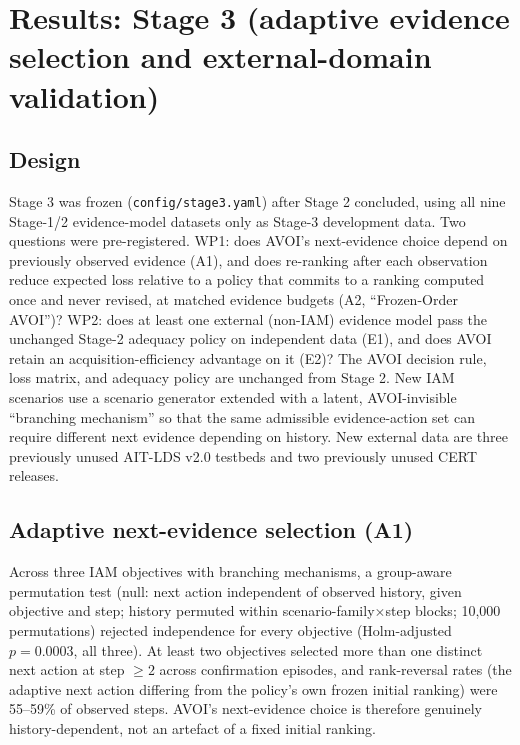 \section{Results: Stage 3 (adaptive evidence selection and external-domain validation)}

\subsection{Design}
Stage 3 was frozen (\texttt{config/stage3.yaml}) after Stage 2 concluded, using all nine Stage-1/2 evidence-model
datasets only as Stage-3 development data. Two questions were pre-registered. WP1: does AVOI's next-evidence choice
depend on previously observed evidence (A1), and does re-ranking after each observation reduce expected loss relative
to a policy that commits to a ranking computed once and never revised, at matched evidence budgets (A2, ``Frozen-Order
AVOI'')? WP2: does at least one external (non-IAM) evidence model pass the unchanged Stage-2 adequacy policy on
independent data (E1), and does AVOI retain an acquisition-efficiency advantage on it (E2)? The AVOI decision rule,
loss matrix, and adequacy policy are unchanged from Stage 2. New IAM scenarios use a scenario generator extended with
a latent, AVOI-invisible ``branching mechanism'' so that the same admissible evidence-action set can require different
next evidence depending on history. New external data are three previously unused AIT-LDS v2.0 testbeds and two
previously unused CERT releases.

\subsection{Adaptive next-evidence selection (A1)}
Across three IAM objectives with branching mechanisms, a group-aware permutation test (null: next action independent
of observed history, given objective and step; history permuted within scenario-family$\times$step blocks; 10{,}000
permutations) rejected independence for every objective (Holm-adjusted $p=0.0003$, all three). At least two objectives
selected more than one distinct next action at step $\ge 2$ across confirmation episodes, and rank-reversal rates
(the adaptive next action differing from the policy's own frozen initial ranking) were 55--59\% of observed steps.
AVOI's next-evidence choice is therefore genuinely history-dependent, not an artefact of a fixed initial ranking.

